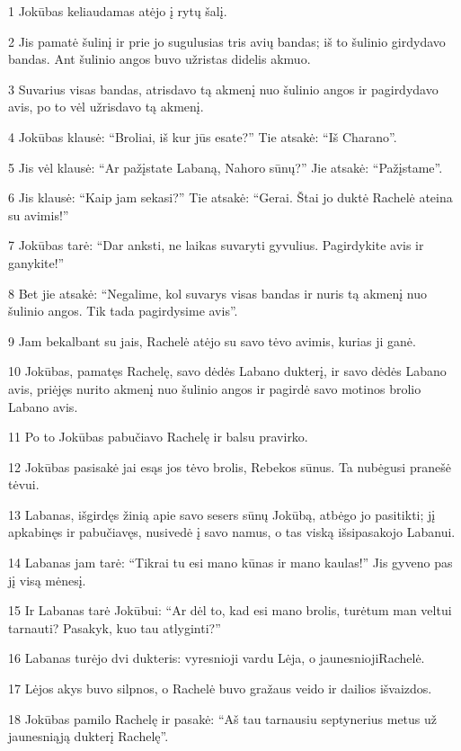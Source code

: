 \par 1 Jokūbas keliaudamas atėjo į rytų šalį. 
\par 2 Jis pamatė šulinį ir prie jo sugulusias tris avių bandas; iš to šulinio girdydavo bandas. Ant šulinio angos buvo užristas didelis akmuo. 
\par 3 Suvarius visas bandas, atrisdavo tą akmenį nuo šulinio angos ir pagirdydavo avis, po to vėl užrisdavo tą akmenį. 
\par 4 Jokūbas klausė: “Broliai, iš kur jūs esate?” Tie atsakė: “Iš Charano”. 
\par 5 Jis vėl klausė: “Ar pažįstate Labaną, Nahoro sūnų?” Jie atsakė: “Pažįstame”. 
\par 6 Jis klausė: “Kaip jam sekasi?” Tie atsakė: “Gerai. Štai jo duktė Rachelė ateina su avimis!” 
\par 7 Jokūbas tarė: “Dar anksti, ne laikas suvaryti gyvulius. Pagirdykite avis ir ganykite!” 
\par 8 Bet jie atsakė: “Negalime, kol suvarys visas bandas ir nuris tą akmenį nuo šulinio angos. Tik tada pagirdysime avis”. 
\par 9 Jam bekalbant su jais, Rachelė atėjo su savo tėvo avimis, kurias ji ganė. 
\par 10 Jokūbas, pamatęs Rachelę, savo dėdės Labano dukterį, ir savo dėdės Labano avis, priėjęs nurito akmenį nuo šulinio angos ir pagirdė savo motinos brolio Labano avis. 
\par 11 Po to Jokūbas pabučiavo Rachelę ir balsu pravirko. 
\par 12 Jokūbas pasisakė jai esąs jos tėvo brolis, Rebekos sūnus. Ta nubėgusi pranešė tėvui. 
\par 13 Labanas, išgirdęs žinią apie savo sesers sūnų Jokūbą, atbėgo jo pasitikti; jį apkabinęs ir pabučiavęs, nusivedė į savo namus, o tas viską išsipasakojo Labanui. 
\par 14 Labanas jam tarė: “Tikrai tu esi mano kūnas ir mano kaulas!” Jis gyveno pas jį visą mėnesį. 
\par 15 Ir Labanas tarė Jokūbui: “Ar dėl to, kad esi mano brolis, turėtum man veltui tarnauti? Pasakyk, kuo tau atlyginti?” 
\par 16 Labanas turėjo dvi dukteris: vyresnioji vardu Lėja, o jaunesnioji­Rachelė. 
\par 17 Lėjos akys buvo silpnos, o Rachelė buvo gražaus veido ir dailios išvaizdos. 
\par 18 Jokūbas pamilo Rachelę ir pasakė: “Aš tau tarnausiu septynerius metus už jaunesniąją dukterį Rachelę”. 
